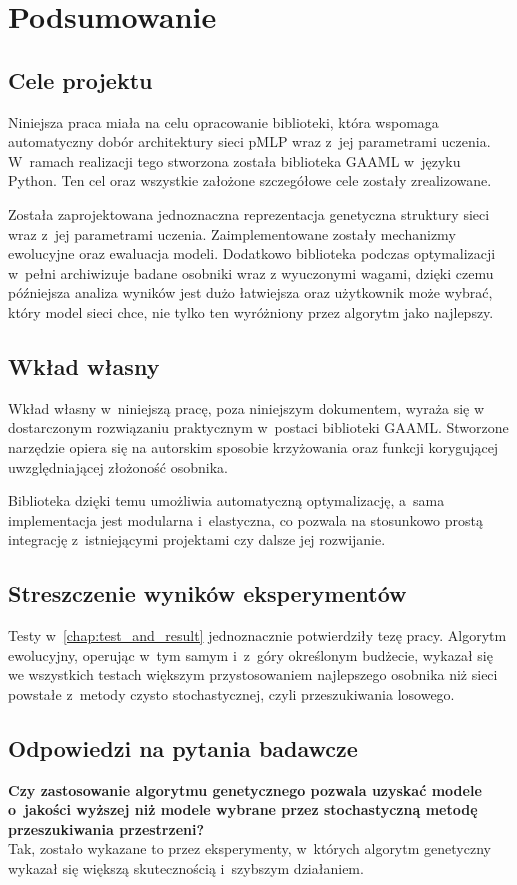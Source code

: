 \chapter{Podsumowanie}
\label{chap:summary}

\section*{Cele projektu}
Niniejsza praca miała na celu opracowanie biblioteki,
która wspomaga automatyczny dobór architektury sieci
\gls{pMLP} wraz z~jej parametrami uczenia.
W~ramach realizacji tego stworzona została
biblioteka \acrfull{GAAML} w~języku Python.
Ten cel oraz wszystkie założone szczegółowe
cele zostały zrealizowane.

Została zaprojektowana jednoznaczna reprezentacja genetyczna
struktury sieci wraz z~jej parametrami uczenia.
Zaimplementowane zostały mechanizmy
ewolucyjne oraz ewaluacja modeli.
Dodatkowo biblioteka podczas optymalizacji w~pełni
archiwizuje badane osobniki wraz z wyuczonymi wagami,
dzięki czemu późniejsza analiza wyników jest dużo łatwiejsza
oraz użytkownik może wybrać, który model sieci chce,
nie tylko ten wyróżniony przez algorytm jako najlepszy.

\section*{Wkład własny}
Wkład własny w~niniejszą pracę, poza niniejszym dokumentem,
wyraża się w dostarczonym rozwiązaniu praktycznym
w~postaci biblioteki \gls{GAAML}.
Stworzone narzędzie opiera się na autorskim
sposobie krzyżowania oraz funkcji korygującej
uwzględniającej złożoność osobnika.

Biblioteka dzięki temu umożliwia
automatyczną optymalizację,
a~sama implementacja jest modularna i~elastyczna,
co pozwala na stosunkowo prostą integrację
z~istniejącymi projektami czy dalsze jej rozwijanie.

\section*{Streszczenie wyników eksperymentów}
Testy w~\cref{chap:test_and_result}
jednoznacznie potwierdziły tezę pracy.
Algorytm ewolucyjny, operując
w~tym samym i~z~góry określonym budżecie,
wykazał się we wszystkich testach większym
przystosowaniem najlepszego osobnika niż sieci
powstałe z~metody czysto stochastycznej,
czyli przeszukiwania losowego.

\section*{Odpowiedzi na pytania badawcze}
\textbf{%
  Czy zastosowanie algorytmu genetycznego
  pozwala uzyskać modele o~jakości wyższej
  niż modele wybrane przez stochastyczną
  metodę przeszukiwania przestrzeni?%
}\\
Tak, zostało wykazane to przez eksperymenty, w~których algorytm genetyczny wykazał się większą skutecznością i~szybszym działaniem.

